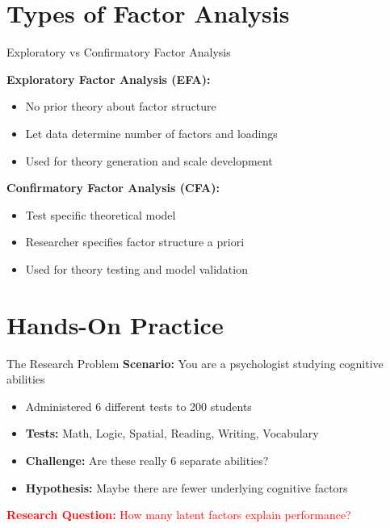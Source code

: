 \documentclass[aspectratio=169]{beamer}
\begin{document}
\section{Types of Factor Analysis}
\begin{frame}{Exploratory vs Confirmatory Factor Analysis}
  
  \textbf{Exploratory Factor Analysis (EFA):}
  \begin{itemize}
    \item No prior theory about factor structure
    \item Let data determine number of factors and loadings
    \item Used for theory generation and scale development
  \end{itemize}
  
  \textbf{Confirmatory Factor Analysis (CFA):}
  \begin{itemize}
    \item Test specific theoretical model
    \item Researcher specifies factor structure a priori
    \item Used for theory testing and model validation
  \end{itemize}
\end{frame}

\section{Hands-On Practice}
\begin{frame}
  \sectionpage
\end{frame}

\begin{frame}{The Research Problem}
  \textbf{Scenario:} You are a psychologist studying cognitive abilities
  
  \begin{itemize}
    \item Administered 6 different tests to 200 students
    \pause
    \item \textbf{Tests:} Math, Logic, Spatial, Reading, Writing, Vocabulary
    \pause
    \item \textbf{Challenge:} Are these really 6 separate abilities?
    \pause
    \item \textbf{Hypothesis:} Maybe there are fewer underlying cognitive factors
  \end{itemize}
  
  \pause
  
  \begin{center}
    \textcolor{red}{\textbf{Research Question:} How many latent factors explain performance?}
  \end{center}
\end{frame}
\end{document}
